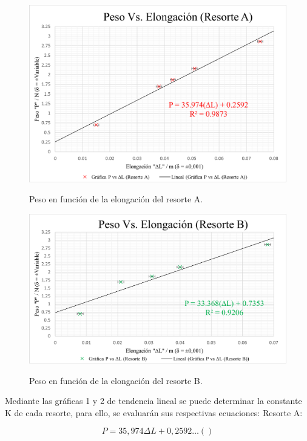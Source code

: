 \documentclass[../main.tex]{subfiles}
\begin{document}
\begin{figure}[H]
    \centering
    \includegraphics[width=0.8\linewidth]{images/calc1.png}
    \label{ref:calc1}
    \caption{Peso en función de la elongación del resorte A.}
\end{figure}
\begin{figure}[H]
    \centering
    \includegraphics[width=0.8\linewidth]{images/calc2.png}
    \label{ref:calc2}
    \caption{Peso en función de la elongación del resorte B.}
\end{figure}

Mediante las gráficas 1 y 2 de tendencia lineal se puede determinar la
constante K de cada resorte, para ello, se evaluarán sus respectivas ecuaciones:
Resorte A:

\[P=35,974 \Delta  L +0,2592…()\]
\end{document}
